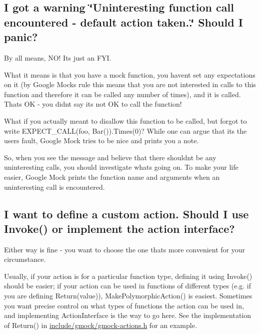 \subsection*{I got a warning \char`\"{}\+Uninteresting function call encountered -\/ default action taken..\char`\"{} Should I panic?}

By all means, N\+O! It\textquotesingle{}s just an F\+YI.

What it means is that you have a mock function, you haven\textquotesingle{}t set any expectations on it (by Google Mock\textquotesingle{}s rule this means that you are not interested in calls to this function and therefore it can be called any number of times), and it is called. That\textquotesingle{}s OK -\/ you didn\textquotesingle{}t say it\textquotesingle{}s not OK to call the function!

What if you actually meant to disallow this function to be called, but forgot to write {\ttfamily E\+X\+P\+E\+C\+T\+\_\+\+C\+A\+L\+L(foo, Bar()).Times(0)}? While one can argue that it\textquotesingle{}s the user\textquotesingle{}s fault, Google Mock tries to be nice and prints you a note.

So, when you see the message and believe that there shouldn\textquotesingle{}t be any uninteresting calls, you should investigate what\textquotesingle{}s going on. To make your life easier, Google Mock prints the function name and arguments when an uninteresting call is encountered.

\subsection*{I want to define a custom action. Should I use Invoke() or implement the action interface?}

Either way is fine -\/ you want to choose the one that\textquotesingle{}s more convenient for your circumstance.

Usually, if your action is for a particular function type, defining it using {\ttfamily Invoke()} should be easier; if your action can be used in functions of different types (e.\+g. if you are defining {\ttfamily Return(value)}), {\ttfamily Make\+Polymorphic\+Action()} is easiest. Sometimes you want precise control on what types of functions the action can be used in, and implementing {\ttfamily Action\+Interface} is the way to go here. See the implementation of {\ttfamily Return()} in {\ttfamily \hyperlink{gmock-actions_8h_source}{include/gmock/gmock-\/actions.\+h}} for an example.

